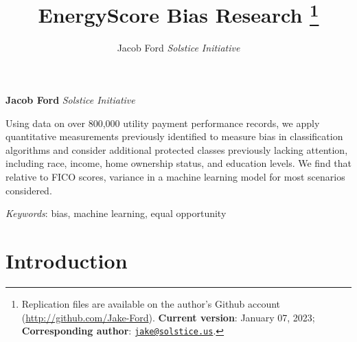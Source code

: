 \documentclass[11pt,]{article}
\title{EnergyScore Bias Research \thanks{Replication files are available
on the author's Github account (\url{http://github.com/Jake-Ford}).
\textbf{Current version}: January 07, 2023; \textbf{Corresponding
author}:
\href{mailto:jake@solstice.us}{\nolinkurl{jake@solstice.us}}.}  }
\author{\Large Jacob
Ford\vspace{0.05in} \newline\normalsize\emph{Solstice Initiative}  }
\date{}
\newcommand*{\authorfont}{\fontfamily{phv}\selectfont}
\renewenvironment{abstract}
 {{%
    \setlength{\leftmargin}{0mm}
    \setlength{\rightmargin}{\leftmargin}%
  }%
  \relax}
 {\endlist}
\begin{document}
	
%    


{%
\setlength{\parindent}{0pt}
\thispagestyle{plain}
{\fontsize{18}{20}\selectfont\raggedright 
\maketitle  %

}

{
   \vskip 13.5pt\relax \normalsize\fontsize{11}{12} 
\textbf{\authorfont Jacob Ford} \hskip 15pt \emph{\small Solstice
Initiative}   

}

}








\begin{abstract}

    \hbox{\vrule height .2pt width 39.14pc}

    \vskip 8.5pt %

\noindent Using data on over 800,000 utility payment performance
records, we apply quantitative measurements previously identified to
measure bias in classification algorithms and consider additional
protected classes previously lacking attention, including race, income,
home ownership status, and education levels. We find that relative to
FICO scores, variance in a machine learning model for most scenarios
considered.


\vskip 8.5pt \noindent \emph{Keywords}: bias, machine learning, equal
opportunity \par

    \hbox{\vrule height .2pt width 39.14pc}



\end{abstract}


\vskip -8.5pt



\noindent  

\hypertarget{introduction}{%
\section{Introduction}\label{introduction}}
\end{document}
